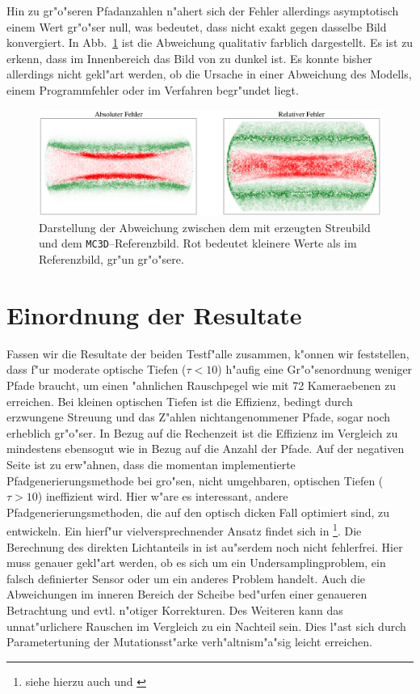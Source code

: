 	Hin zu gr"o"seren Pfadanzahlen n"ahert sich der Fehler allerdings asymptotisch einem Wert gr"o"ser null, was bedeutet, dass \pirate nicht exakt gegen dasselbe Bild konvergiert. In Abb.~\ref{fig:resdiskplot} ist die Abweichung qualitativ farblich dargestellt. Es ist zu erkenn, dass im Innenbereich das Bild von \pirate zu dunkel ist. Es konnte bisher allerdings nicht gekl"art werden, ob die Ursache in einer Abweichung des Modells, einem Programmfehler oder im Verfahren begr"undet liegt.
	
		\begin{figure}
			\centering
			\includegraphics[width=1.0\textwidth]{resdiskplot.eps}
			\caption{Darstellung der Abweichung zwischen dem mit \pirate erzeugten Streubild und dem \texttt{MC3D}--Referenzbild. Rot bedeutet kleinere Werte als im Referenzbild, gr"un gr"o"sere.}
			\label{fig:resdiskplot}
		\end{figure}
	

	\section{Einordnung der Resultate}
	Fassen wir die Resultate der beiden Testf"alle zusammen, k"onnen wir feststellen, dass \pirate f"ur moderate optische Tiefen ($\tau < 10$) h"aufig eine Gr"o"senordnung weniger Pfade braucht, um einen "ahnlichen Rauschpegel wie \mctd mit 72 Kameraebenen zu erreichen. Bei kleinen optischen Tiefen ist die Effizienz, bedingt durch erzwungene Streuung und das Z"ahlen nichtangenommener Pfade, sogar noch erheblich gr"o"ser. In Bezug auf die Rechenzeit ist die Effizienz im Vergleich zu \mctd mindestens ebensogut wie in Bezug auf die Anzahl der Pfade. Auf der negativen Seite ist zu erw"ahnen, dass die momentan implementierte Pfadgenerierungsmethode bei gro"sen, nicht umgehbaren, optischen Tiefen ($\tau>10$) ineffizient wird. Hier w"are es interessant, andere Pfadgenerierungsmethoden, die auf den optisch dicken Fall optimiert sind, zu entwickeln. Ein hierf"ur vielversprechnender Ansatz findet sich in \citet{Laszlo:2005p11056}\footnote{siehe hierzu auch \citep{DAldous:1994p11528} und \citep{Grassberger:2002p10876}}. Die Berechnung des direkten Lichtanteils in \pirate ist au"serdem noch nicht fehlerfrei. Hier muss genauer gekl"art werden, ob es sich um ein Undersamplingproblem, ein falsch definierter Sensor oder um ein anderes Problem handelt. Auch die Abweichungen im inneren Bereich der Scheibe bed"urfen einer genaueren Betrachtung und evtl. n"otiger Korrekturen. Des Weiteren kann das unnat"urlichere Rauschen im Vergleich zu \mctd ein Nachteil sein. Dies l"ast sich durch Parametertuning der Mutationsst"arke verh"altnism"a"sig leicht erreichen.
	
